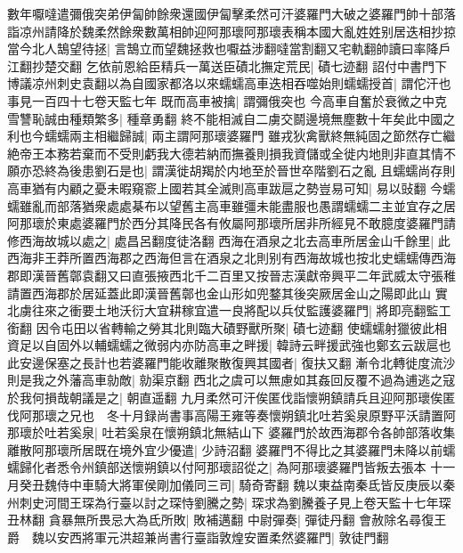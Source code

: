 數年嚈噠遣彌俄突弟伊匐帥餘衆還國伊匐擊柔然可汗婆羅門大破之婆羅門帥十部落詣凉州請降於魏柔然餘衆數萬相帥迎阿那瓌阿那瓌表稱本國大亂姓姓别居迭相抄掠當今北人鵠望待拯|{
	言鵠立而望魏拯救也嚈益涉翻噠當割翻又宅軌翻帥讀曰率降戶江翻抄楚交翻}
乞依前恩給臣精兵一萬送臣磧北撫定荒民|{
	磧七迹翻}
詔付中書門下博議凉州刺史袁翻以為自國家都洛以來蠕蠕高車迭相吞噬始則蠕蠕授首|{
	謂佗汗也事見一百四十七卷天監七年}
既而高車被擒|{
	謂彌俄突也}
今高車自奮於衰微之中克雪讐恥誠由種類繁多|{
	種章勇翻}
終不能相滅自二虜交鬬邊境無塵數十年矣此中國之利也今蠕蠕兩主相繼歸誠|{
	兩主謂阿那瓌婆羅門}
雖戎狄禽獸終無純固之節然存亡繼絶帝王本務若棄而不受則虧我大德若納而撫養則損我資儲或全徙内地則非直其情不願亦恐終為後患劉石是也|{
	謂漢徙胡羯於内地至於晉世卒階劉石之亂}
且蠕蠕尚存則高車猶有内顧之憂未暇窺窬上國若其全滅則高車跋扈之勢豈易可知|{
	易以䜴翻}
今蠕蠕雖亂而部落猶衆處處棊布以望舊主高車雖彊未能盡服也愚謂蠕蠕二主並宜存之居阿那瓌於東處婆羅門於西分其降民各有攸屬阿那瓌所居非所經見不敢臆度婆羅門請修西海故城以處之|{
	處昌呂翻度徒洛翻}
西海在酒泉之北去高車所居金山千餘里|{
	此西海非王莽所置西海郡之西海但言在酒泉之北則别有西海故城也按北史蠕蠕傳西海郡即漢晉舊鄣袁翻又曰直張掖西北千二百里又按晉志漢獻帝興平二年武威太守張稚請置西海郡於居延蓋此即漢晉舊鄣也金山形如兜鍪其後突厥居金山之陽即此山}
實北虜往來之衝要土地沃衍大宜耕稼宜遣一良將配以兵仗監護婆羅門|{
	將即亮翻監工銜翻}
因令屯田以省轉輸之勞其北則臨大磧野獸所聚|{
	磧七迹翻}
使蠕蠕射獵彼此相資足以自固外以輔蠕蠕之微弱内亦防高車之畔援|{
	韓詩云畔援武強也鄭玄云跋扈也}
此安邊保塞之長計也若婆羅門能收離聚散復興其國者|{
	復扶又翻}
漸令北轉徙度流沙則是我之外藩高車勍敵|{
	勍渠京翻}
西北之虞可以無慮如其姦回反覆不過為逋逃之寇於我何損哉朝議是之|{
	朝直遥翻}
九月柔然可汗俟匿伐詣懷朔鎮請兵且迎阿那瓌俟匿伐阿那瓌之兄也　冬十月録尚書事高陽王雍等奏懷朔鎮北吐若奚泉原野平沃請置阿那瓌於吐若奚泉|{
	吐若奚泉在懷朔鎮北無結山下}
婆羅門於故西海郡令各帥部落收集離散阿那瓌所居既在境外宜少優遣|{
	少詩沼翻}
婆羅門不得比之其婆羅門未降以前蠕蠕歸化者悉令州鎮部送懷朔鎮以付阿那瓌詔從之|{
	為阿那瓌婆羅門皆叛去張本}
十一月癸丑魏侍中車騎大將軍侯剛加儀同三司|{
	騎奇寄翻}
魏以東益南秦氐皆反庚辰以秦州刺史河間王琛為行臺以討之琛恃劉騰之勢|{
	琛求為劉騰養子見上卷天監十七年琛丑林翻}
貪暴無所畏忌大為氐所敗|{
	敗補邁翻}
中尉彈奏|{
	彈徒丹翻}
會赦除名尋復王爵　魏以安西將軍元洪超兼尚書行臺詣敦煌安置柔然婆羅門|{
	敦徒門翻}


